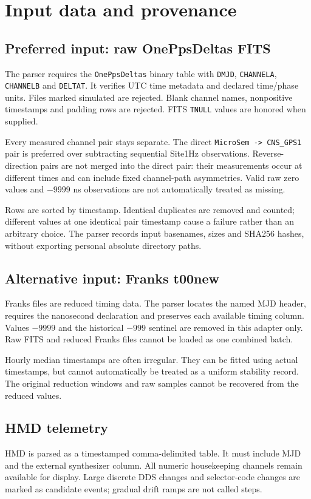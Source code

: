 \documentclass[11pt,a4paper]{article}
\begin{document}
\section{Input data and provenance}
\subsection{Preferred input: raw OnePpsDeltas FITS}
The parser requires the \texttt{OnePpsDeltas} binary table with \texttt{DMJD},
\texttt{CHANNELA}, \texttt{CHANNELB} and \texttt{DELTAT}. It verifies UTC time
metadata and declared time/phase units. Files marked simulated are rejected.
Blank channel names, nonpositive timestamps and padding rows are rejected.
FITS \texttt{TNULL} values are honored when supplied.

Every measured channel pair stays separate. The direct
\texttt{MicroSem -> CNS\_GPS1} pair is preferred over subtracting sequential
Site1Hz observations. Reverse-direction pairs are not merged into the direct
pair: their measurements occur at different times and can include fixed
channel-path asymmetries. Valid raw zero values and \(-9999\) ns observations
are not automatically treated as missing.

Rows are sorted by timestamp. Identical duplicates are removed and counted;
different values at one identical pair timestamp cause a failure rather than
an arbitrary choice. The parser records input basenames, sizes and SHA256
hashes, without exporting personal absolute directory paths.

\subsection{Alternative input: Franks t00new}
Franks files are reduced timing data. The parser locates the named MJD header,
requires the nanosecond declaration and preserves each available timing column.
Values \(-9999\) and the historical \(-999\) sentinel are removed in this adapter
only. Raw FITS and reduced Franks files cannot be loaded as one combined batch.

Hourly median timestamps are often irregular. They can be fitted using actual
timestamps, but cannot automatically be treated as a uniform stability record.
The original reduction windows and raw samples cannot be recovered from the
reduced values.

\subsection{HMD telemetry}
HMD is parsed as a timestamped comma-delimited table. It must include MJD and
the external synthesizer column. All numeric housekeeping channels remain
available for display. Large discrete DDS changes and selector-code changes
are marked as candidate events; gradual drift ramps are not called steps.
\end{document}
